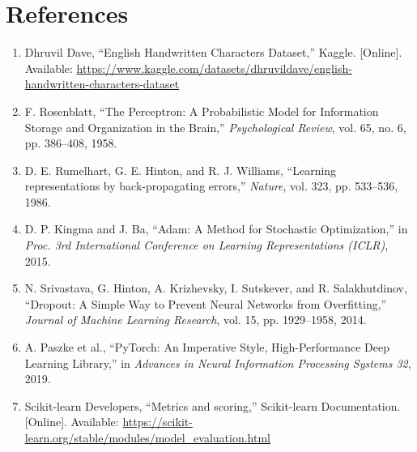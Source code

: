 \documentclass[12pt,a4paper]{article}
\begin{document}
\section{References}
\begin{enumerate}
\item Dhruvil Dave, ``English Handwritten Characters Dataset,'' Kaggle. [Online]. Available:
\url{https://www.kaggle.com/datasets/dhruvildave/english-handwritten-characters-dataset}
\item F. Rosenblatt, ``The Perceptron: A Probabilistic Model for Information Storage and
Organization in the Brain,'' \emph{Psychological Review}, vol. 65, no. 6, pp. 386--408, 1958.
\item D. E. Rumelhart, G. E. Hinton, and R. J. Williams, ``Learning representations by
back-propagating errors,'' \emph{Nature}, vol. 323, pp. 533--536, 1986.
\item D. P. Kingma and J. Ba, ``Adam: A Method for Stochastic Optimization,'' in \emph{Proc. 3rd
International Conference on Learning Representations (ICLR)}, 2015.
\item N. Srivastava, G. Hinton, A. Krizhevsky, I. Sutskever, and R. Salakhutdinov, ``Dropout: A
Simple Way to Prevent Neural Networks from Overfitting,'' \emph{Journal of Machine Learning
Research}, vol. 15, pp. 1929--1958, 2014.
\item A. Paszke et al., ``PyTorch: An Imperative Style, High-Performance Deep Learning Library,''
in \emph{Advances in Neural Information Processing Systems 32}, 2019.
\item Scikit-learn Developers, ``Metrics and scoring,'' Scikit-learn Documentation. [Online].
Available: \url{https://scikit-learn.org/stable/modules/model_evaluation.html}
\end{enumerate}
\end{document}
